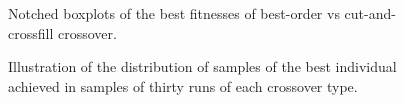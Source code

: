\documentclass[12pt,twocolumn,oneside]{osajnl}
\begin{document}
\begin{figure}[htbp]
\centering
{}
\caption{Notched boxplots of the best fitnesses of best-order vs cut-and-crossfill crossover.}
\label{fig:bovboxplot}
\end{figure}

\begin{figure}[htbp]
\centering
{}
\caption{Illustration of the distribution of samples of the best individual achieved in samples of thirty runs of each crossover type.}
\label{fig:bocchist}
\end{figure}
\end{document}
